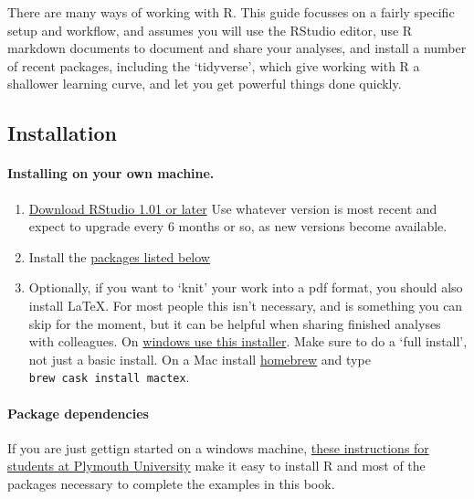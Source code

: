 \documentclass[]{article}
\let\oldparagraph\paragraph
\renewcommand{\paragraph}[1]{\oldparagraph{#1}\mbox{}}
\begin{document}
There are many ways of working with R. This guide focusses on a fairly specific
setup and workflow, and assumes you will use the RStudio editor, use R markdown
documents to document and share your analyses, and install a number of recent
packages, including the `tidyverse', which give working with R a shallower
learning curve, and let you get powerful things done quickly.

\hypertarget{installation-intro}{%
\subsection*{Installation}\label{installation-intro}}

\hypertarget{local-install}{%
\paragraph{Installing on your own machine.}\label{local-install}}

\begin{enumerate}
\def\labelenumi{\arabic{enumi}.}
\item
  \href{https://www.rstudio.com/products/rstudio/download/}{Download RStudio 1.01 or later}
  Use whatever version is most recent and expect to upgrade every 6 months or
  so, as new versions become available.
\item
  Install the \protect\hyperlink{dependencies}{packages listed below}
\item
  Optionally, if you want to `knit' your work into a pdf format, you should
  also install LaTeX. For most people this isn't necessary, and is something
  you can skip for the moment, but it can be helpful when sharing finished
  analyses with colleagues. On
  \href{https://miktex.org/download}{windows use this installer}. Make sure to do a
  `full install', not just a basic install. On a Mac install
  \href{https://brew.sh}{homebrew} and type \texttt{brew\ cask\ install\ mactex}.
\end{enumerate}

\hypertarget{dependencies}{%
\paragraph{Package dependencies}\label{dependencies}}

If you are just gettign started on a windows machine,
\href{https://github.com/PlymouthPsychology/installR/blob/master/install-windows-stage1.md}{these instructions for students at Plymouth University}
make it easy to install R and most of the packages necessary to complete the
examples in this book.
\end{document}
